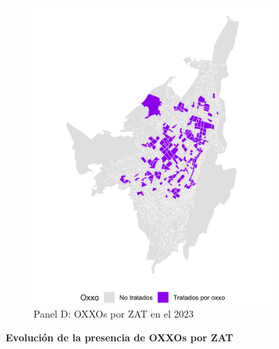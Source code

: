 \documentclass{article}
\begin{document}
\begin{figure}
\begin{subfigure}[b]{0.4\textwidth}
        \includegraphics[width=\linewidth]{figs_oxxo_maps/mapa_oxxos_binary_2023.png}
        \caption{Panel D: OXXOs por ZAT en el 2023}
        \label{fig:panelD}
    \end{subfigure}
    
    \caption{
        \textbf{Evolución de la presencia de OXXOs por ZAT}
    }
    \label{fig:fourpanel}
\end{figure}
\end{document}

